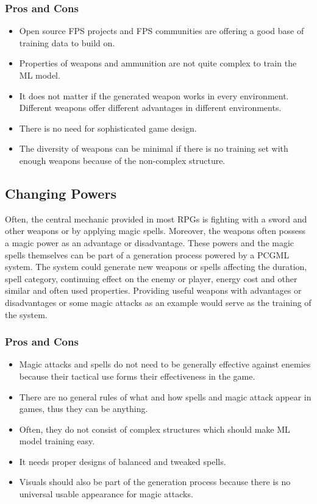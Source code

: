 \documentclass[MGS,Master,english]{twbook}%
\begin{document}
\subsubsection{Pros and Cons}
\begin{itemize}
	\item Open source \ac{FPS} projects and \ac{FPS} communities are offering a good base of training data to build on.
	\item Properties of weapons and ammunition are not quite complex to train the \ac{ML} model.
	\item It does not matter if the generated weapon works in every environment. Different weapons offer different advantages in different environments.
	\item There is no need for sophisticated game design.
	\item The diversity of weapons can be minimal if there is no training set with enough weapons because of the non-complex structure.
\end{itemize}

\subsection{Changing Powers} \label{idea::changingPowers}
Often, the central mechanic provided in most \acp{RPG} is fighting with a sword and other weapons or by applying magic spells. Moreover, the weapons often possess a magic power as an advantage or disadvantage. These powers and the magic spells themselves can be part of a generation process powered by a \ac{PCGML} system. The system could generate new weapons or spells affecting the duration, spell category, continuing effect on the enemy or player, energy cost and other similar and often used properties. Providing useful weapons with advantages or disadvantages or some magic attacks as an example would serve as the training of the system.

\subsubsection{Pros and Cons}
\begin{itemize}
	\item Magic attacks and spells do not need to be generally effective against enemies because their tactical use forms their effectiveness in the game.
	\item There are no general rules of what and how spells and magic attack appear in games, thus they can be anything.
	\item Often, they do not consist of complex structures which should make \ac{ML} model training easy.
	\item It needs proper designs of balanced and tweaked spells.
	\item Visuals should also be part of the generation process because there is no universal usable appearance for magic attacks.
\end{itemize}
\end{document}
